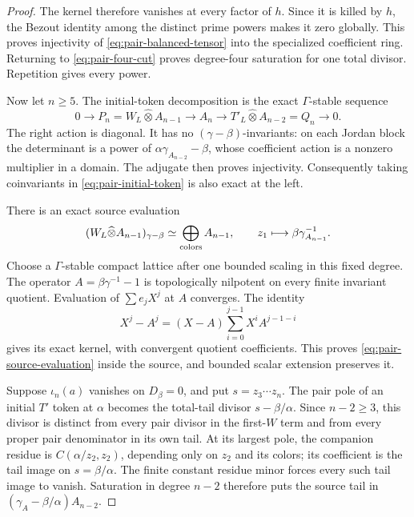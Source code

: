 \documentclass[11pt]{article}
\theoremstyle{definition}\newtheorem{definition}[theorem]{Definition}
\begin{document}
\begin{proof}
The kernel therefore vanishes at every factor of $h$.
Since it is killed by $h$, the Bezout identity among
the distinct prime powers makes it zero globally.
This proves injectivity of
\eqref{eq:pair-balanced-tensor} into the specialized
coefficient ring. Returning to
\eqref{eq:pair-four-cut} proves degree-four saturation
for one total divisor. Repetition gives every power.

Now let $n\geq5$. The initial-token decomposition is
the exact $\Gamma$-stable sequence
\begin{equation}\label{eq:pair-initial-token}
 0\longrightarrow P_n=W_L\widehat\otimes A_{n-1}
 \longrightarrow A_n
 \longrightarrow T'_L\widehat\otimes A_{n-2}=Q_n
 \longrightarrow0.
\end{equation}
The right action is diagonal. It has no
$(\gamma-\beta)$-invariants: on each Jordan block
the determinant is a power of
$\alpha\gamma_{A_{n-2}}-\beta$, whose coefficient
action is a nonzero multiplier in a domain.
The adjugate then proves injectivity. Consequently
taking coinvariants in \eqref{eq:pair-initial-token}
is also exact at the left.

There is an exact source evaluation
\begin{equation}\label{eq:pair-source-evaluation}
 (W_L\widehat\otimes A_{n-1})_{\gamma-\beta}
                  \simeq\bigoplus_{\rm colors}A_{n-1},
                 \qquad z_1\longmapsto\beta\gamma_{A_{n-1}}^{-1}.
\end{equation}
Choose a $\Gamma$-stable compact lattice after one
bounded scaling in this fixed degree. The operator
$A=\beta\gamma^{-1}-1$ is topologically nilpotent on
every finite invariant quotient. Evaluation of
$\sum e_jX^j$ at $A$ converges. The identity
\[
 X^j-A^j=(X-A)\sum_{i=0}^{j-1}X^iA^{j-1-i}
\]
gives its exact kernel, with convergent quotient
coefficients. This proves
\eqref{eq:pair-source-evaluation} inside the source,
and bounded scalar extension preserves it.

Suppose $\iota_n(a)$ vanishes on $D_\beta=0$, and put
$s=z_3\cdots z_n$. The pair pole of an initial $T'$
token at $\alpha$ becomes the total-tail divisor
$s-\beta/\alpha$. Since $n-2\geq3$, this divisor is
distinct from every pair divisor in the first-$W$
term and from every proper pair denominator in its
own tail. At its largest pole, the companion residue
is $C(\alpha/z_2,z_2)$, depending only on $z_2$ and
its colors; its coefficient is the tail image on
$s=\beta/\alpha$. The finite constant residue minor
forces every such tail image to vanish. Saturation
in degree $n-2$ therefore puts the source
tail in $(\gamma_A-\beta/\alpha)A_{n-2}$.


\end{proof}
\end{document}
